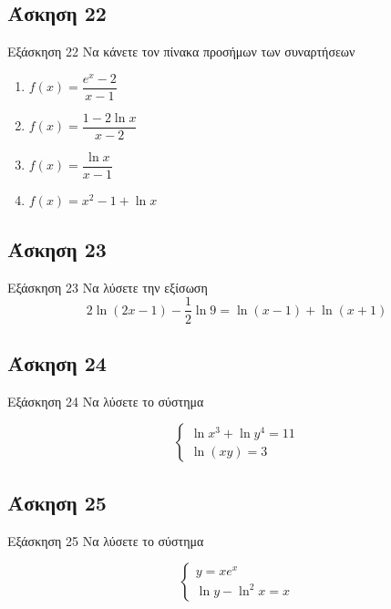 \documentclass[greek]{beamer}
\begin{document}
\subsection{Άσκηση 22}
\begin{frame}[label=Άσκηση22,t]{Εξάσκηση 22}
  Να κάνετε τον πίνακα προσήμων των συναρτήσεων
  \begin{enumerate}
    \item<1-> $f(x)=\dfrac{e^x-2}{x-1}$
    \item<2-> $f(x)=\dfrac{1-2\ln x}{x-2}$
    \item<3-> $f(x)=\dfrac{\ln x}{x-1}$
    \item<4-> $f(x)=x^2-1+\ln x$
  \end{enumerate}

\end{frame}

\subsection{Άσκηση 23}
\begin{frame}[label=Άσκηση23,t]{Εξάσκηση 23}
  Να λύσετε την εξίσωση
  $$2\ln (2x-1)-\dfrac{1}{2}\ln 9=\ln (x-1)+\ln (x+1)$$

\end{frame}

\subsection{Άσκηση 24}
\begin{frame}[label=Άσκηση24,t]{Εξάσκηση 24}
  Να λύσετε το σύστημα

  $$\begin{cases}
      \ln x^3+\ln y^4=11 \\
      \ln (xy)=3
    \end{cases}$$

\end{frame}

\subsection{Άσκηση 25}
\begin{frame}[label=Άσκηση25,t]{Εξάσκηση 25}
  Να λύσετε το σύστημα

  $$\begin{cases}
      y=xe^x \\
      \ln y-\ln^2x=x
    \end{cases}$$

\end{frame}
\end{document}
